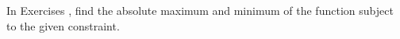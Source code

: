{\noindent In Exercises}
{, find the absolute maximum and minimum of the function subject to the given constraint.
}
